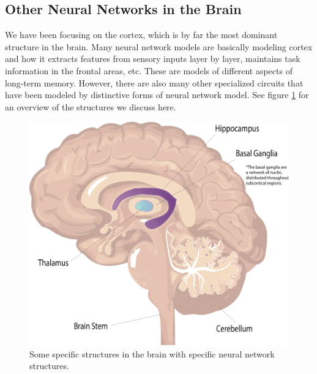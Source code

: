 \subsection{Other Neural Networks in the Brain }

We have been focusing on the cortex, which is by far the most dominant structure in the brain. Many neural network models are basically modeling cortex and how it extracts features from sensory inputs layer by layer, maintains task information in the frontal areas, etc. These are models of different aspects of long-term memory. However, there are also many other specialized circuits that have been modeled by distinctive forms of neural network model. See figure \ref{brain_internal} for an overview of the structures we discuss here.

\begin{figure}[h]
\centering
\includegraphics[width=.5\textwidth]{./images/brain_internal.png}
\caption[Pamela Payne.]{Some specific structures in the brain with specific neural network structures.}
\label{brain_internal}
\end{figure}

